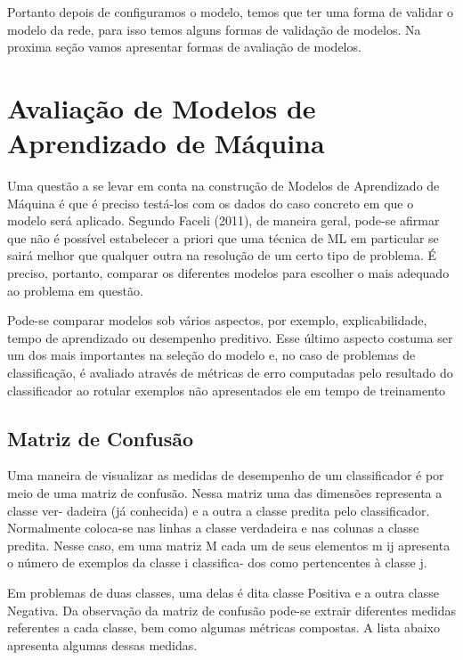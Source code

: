 \documentclass[openright]{UFRGS} %
\begin{document}
Portanto depois de configuramos o modelo, temos que ter uma forma de validar
o modelo da rede, para isso temos alguns formas de validação de modelos. Na proxima seção vamos apresentar formas de avaliação de modelos.

\section{Avaliação de Modelos de Aprendizado de Máquina}

Uma questão a se levar em conta na construção de Modelos de Aprendizado de
Máquina é que é preciso testá-los com os dados do caso concreto em que o modelo será
aplicado. Segundo Faceli (2011), de maneira geral, pode-se afirmar que não é possível estabelecer a priori que uma técnica de ML em particular se sairá melhor que qualquer outra
na resolução de um certo tipo de problema. É preciso, portanto, comparar os diferentes
modelos para escolher o mais adequado ao problema em questão.

Pode-se comparar modelos sob vários aspectos, por exemplo, explicabilidade,
tempo de aprendizado ou desempenho preditivo. Esse último aspecto costuma ser um
dos mais importantes na seleção do modelo e, no caso de problemas de classificação, é
avaliado através de métricas de erro computadas pelo resultado do classificador ao rotular
exemplos não apresentados ele em tempo de treinamento


\subsection{Matriz de Confusão}

Uma maneira de visualizar as medidas de desempenho de um classificador é por
meio de uma matriz de confusão. Nessa matriz uma das dimensões representa a classe ver-
dadeira (já conhecida) e a outra a classe predita pelo classificador. Normalmente coloca-se
nas linhas a classe verdadeira e nas colunas a classe predita. Nesse caso, em uma matriz
M cada um de seus elementos m ij apresenta o número de exemplos da classe i classifica-
dos como pertencentes à classe j.

Em problemas de duas classes, uma delas é dita classe Positiva e a outra classe
Negativa. Da observação da matriz de confusão pode-se extrair diferentes medidas referentes a cada classe, bem como algumas métricas compostas. A lista abaixo apresenta
algumas dessas medidas.
\end{document}
